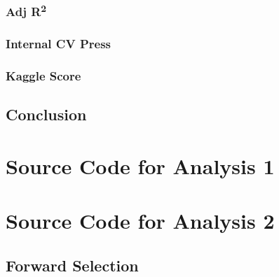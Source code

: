 \documentclass[11pt]{scrartcl} %
\begin{document}
\subsubsection{Adj R\textsuperscript{2}}
\subsubsection{Internal CV Press}
\subsubsection{Kaggle Score}

\subsection{Conclusion}


\appendix{} 

\pagebreak
\section{Source Code for Analysis 1}
\label{sec:Analysis1}



\pagebreak

\section{Source Code for Analysis 2}
\label{sec:Analysis2}

\subsection{Forward Selection}

\end{document}
